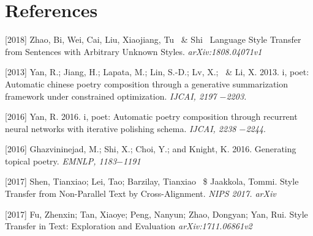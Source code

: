 \documentclass{article}
\begin{document}
\section*{References}

\medskip

\small

[2018] Zhao, Bi, Wei, Cai, Liu, Xiaojiang, Tu \ \& Shi \ Language Style Transfer from Sentences with Arbitrary Unknown Styles. {\it arXiv:1808.04071v1}

[2013] Yan, R.; Jiang, H.; Lapata, M.; Lin, S.-D.; Lv, X.;  \ \& Li, X. 2013. i, poet: Automatic chinese poetry composition through a generative summarization framework under constrained optimization. {\it IJCAI, 2197 $-$2203.}

[2016] Yan, R. 2016. i, poet: Automatic poetry composition through recurrent neural networks with iterative polishing schema. {\it IJCAI, 2238 $-$2244}.

[2016] Ghazvininejad, M.; Shi, X.; Choi, Y.; and Knight, K. 2016. Generating topical poetry. {\it EMNLP, 1183$-$1191}

[2017] Shen, Tianxiao; Lei, Tao; Barzilay, Tianxiao \ \$ Jaakkola, Tommi. Style Transfer from Non-Parallel Text by Cross-Alignment. {\it NIPS 2017. arXiv}

[2017] Fu, Zhenxin; Tan, Xiaoye; Peng, Nanyun; Zhao, Dongyan; Yan, Rui. Style Transfer in Text: Exploration and Evaluation {\it arXiv:1711.06861v2 }
\end{document}

